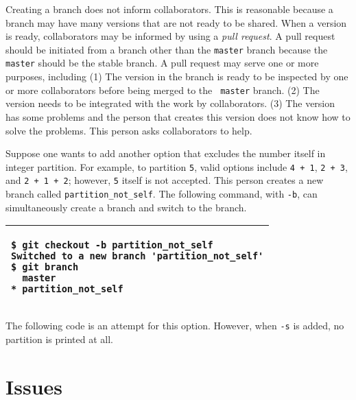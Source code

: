 Creating a branch does not inform collaborators. This is reasonable
because a branch may have many versions that are not ready to be
shared. When a version is ready, collaborators may be informed by
using a {\it pull request}. A pull request should be initiated from a
branch other than the {\tt master} branch because the {\tt master}
should be the stable branch. A pull request may serve one or more
purposes, including (1) The version in the branch is ready to be
inspected by one or more collaborators before being merged to the {\tt
  master} branch. (2) The version needs to be integrated with the work
by collaborators. (3) The version has some problems and the person
that creates this version does not know how to solve the
problems. This person asks collaborators to help.

Suppose one wants to add another option that excludes the number itself in
integer partition. For example, to partition {\tt 5}, valid options include
{\tt 4 + 1}, {\tt 2 + 3}, and {\tt 2 + 1 + 2}; however, {\tt 5} itself is not accepted.
This person creates a new branch called {\tt partition\_not\_self}. 
The following command, with {\tt -b}, can simultaneously create a branch and switch to the
branch.

\vspace{0.2in}
\noindent
\begin{tabular}{|p{5in}|}\hline
\begin{verbatim}
$ git checkout -b partition_not_self
Switched to a new branch 'partition_not_self'
$ git branch
  master
* partition_not_self
\end{verbatim}
\\ \hline
\end{tabular}
\vspace{0.2in}

The following code is an attempt for this option. However,
when {\tt -s} is added, no partition is printed at all.

\resetlinenumber[1]
\linenumbers
\begin{tt}
  
\end{tt}
\nolinenumbers


\section{Issues}
